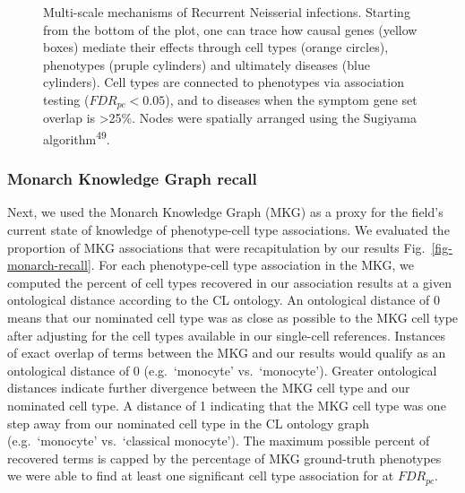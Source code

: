 \documentclass[
]{agujournal2019}
\begin{document}
\begin{figure}


\caption{\label{fig-network-rni}Multi-scale mechanisms of Recurrent
Neisserial infections. Starting from the bottom of the plot, one can
trace how causal genes (yellow boxes) mediate their effects through cell
types (orange circles), phenotypes (pruple cylinders) and ultimately
diseases (blue cylinders). Cell types are connected to phenotypes via
association testing (\(FDR_{pc}<0.05\)), and to diseases when the
symptom gene set overlap is \textgreater25\%. Nodes were spatially
arranged using the Sugiyama algorithm\textsuperscript{49}.}

\end{figure}%

\subsubsection{Monarch Knowledge Graph
recall}\label{monarch-knowledge-graph-recall}

Next, we used the Monarch Knowledge Graph (MKG) as a proxy for the
field's current state of knowledge of phenotype-cell type associations.
We evaluated the proportion of MKG associations that were recapitulation
by our results Fig.~\ref{fig-monarch-recall}. For each phenotype-cell
type association in the MKG, we computed the percent of cell types
recovered in our association results at a given ontological distance
according to the CL ontology. An ontological distance of 0 means that
our nominated cell type was as close as possible to the MKG cell type
after adjusting for the cell types available in our single-cell
references. Instances of exact overlap of terms between the MKG and our
results would qualify as an ontological distance of 0 (e.g.~`monocyte'
vs.~`monocyte'). Greater ontological distances indicate further
divergence between the MKG cell type and our nominated cell type. A
distance of 1 indicating that the MKG cell type was one step away from
our nominated cell type in the CL ontology graph (e.g.~`monocyte'
vs.~`classical monocyte'). The maximum possible percent of recovered
terms is capped by the percentage of MKG ground-truth phenotypes we were
able to find at least one significant cell type association for at
\(FDR_{pc}\).
\end{document}

